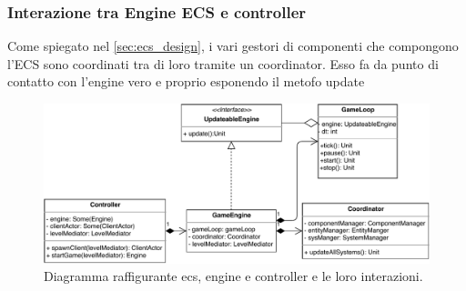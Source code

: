 	\subsubsection{Interazione tra Engine ECS e controller}
	Come spiegato nel \ref{sec:ecs_design}, i vari gestori di componenti che compongono l'ECS sono coordinati tra di loro tramite un coordinator. Esso fa da punto di contatto con l'engine vero e proprio esponendo il metofo update
	\begin{figure}[H]
		\centering
		\includegraphics[width=\columnwidth]{drawio/ECS-engine-controller/ecs-engine-controller.pdf}
		\caption{Diagramma raffigurante ecs, engine e controller e le loro interazioni.}
		\label{fig:ecsenginecontroller}
	\end{figure}